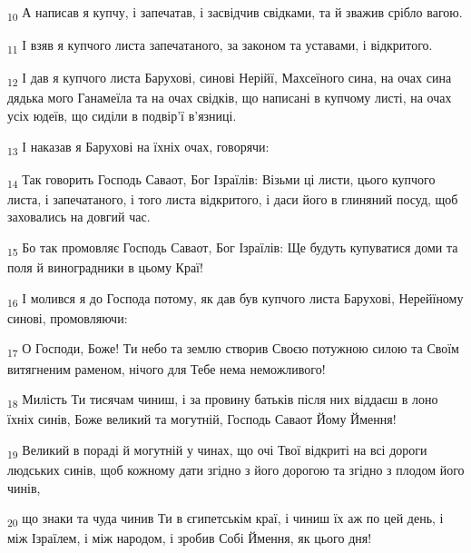 \begin{tcolorbox}
\textsubscript{10} А написав я купчу, і запечатав, і засвідчив свідками, та й зважив срібло вагою.
\end{tcolorbox}
\begin{tcolorbox}
\textsubscript{11} І взяв я купчого листа запечатаного, за законом та уставами, і відкритого.
\end{tcolorbox}
\begin{tcolorbox}
\textsubscript{12} І дав я купчого листа Барухові, синові Нерійї, Махсеїного сина, на очах сина дядька мого Ганамеїла та на очах свідків, що написані в купчому листі, на очах усіх юдеїв, що сиділи в подвір'ї в'язниці.
\end{tcolorbox}
\begin{tcolorbox}
\textsubscript{13} І наказав я Барухові на їхніх очах, говорячи:
\end{tcolorbox}
\begin{tcolorbox}
\textsubscript{14} Так говорить Господь Саваот, Бог Ізраїлів: Візьми ці листи, цього купчого листа, і запечатаного, і того листа відкритого, і даси його в глиняний посуд, щоб заховались на довгий час.
\end{tcolorbox}
\begin{tcolorbox}
\textsubscript{15} Бо так промовляє Господь Саваот, Бог Ізраїлів: Ще будуть купуватися доми та поля й виноградники в цьому Краї!
\end{tcolorbox}
\begin{tcolorbox}
\textsubscript{16} І молився я до Господа потому, як дав був купчого листа Барухові, Нерейїному синові, промовляючи:
\end{tcolorbox}
\begin{tcolorbox}
\textsubscript{17} О Господи, Боже! Ти небо та землю створив Своєю потужною силою та Своїм витягненим раменом, нічого для Тебе нема неможливого!
\end{tcolorbox}
\begin{tcolorbox}
\textsubscript{18} Милість Ти тисячам чиниш, і за провину батьків після них віддаєш в лоно їхніх синів, Боже великий та могутній, Господь Саваот Йому Ймення!
\end{tcolorbox}
\begin{tcolorbox}
\textsubscript{19} Великий в пораді й могутній у чинах, що очі Твої відкриті на всі дороги людських синів, щоб кожному дати згідно з його дорогою та згідно з плодом його чинів,
\end{tcolorbox}
\begin{tcolorbox}
\textsubscript{20} що знаки та чуда чинив Ти в єгипетськім краї, і чиниш їх аж по цей день, і між Ізраїлем, і між народом, і зробив Собі Ймення, як цього дня!
\end{tcolorbox}
